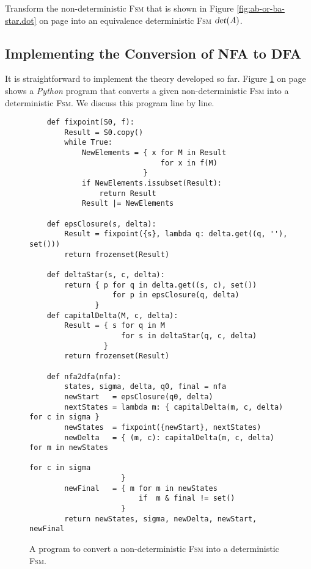 \exerciseEng
Transform the non-deterministic \textsc{Fsm} that is shown in Figure \ref{fig:ab-or-ba-star.dot} on page
\pageref{fig:ab-or-ba-star.dot} 
into an equivalence deterministic \textsc{Fsm} $\textsl{det}(A)$. \eox


\subsection{Implementing the Conversion of NFA to DFA}
It is straightforward to implement the theory developed so far. 
Figure \ref{fig:NFA-2-DFA.ipynb} on page \pageref{fig:NFA-2-DFA.ipynb} shows a \textsl{Python} program 
that converts a given non-deterministic \textsc{Fsm} into a deterministic \textsc{Fsm}.
We discuss this program line by line.

\begin{figure}[!ht]
\centering
\begin{verbatim}
    def fixpoint(S0, f):
        Result = S0.copy()
        while True:
            NewElements = { x for M in Result 
                              for x in f(M) 
                          }
            if NewElements.issubset(Result):
                return Result
            Result |= NewElements

    def epsClosure(s, delta):
        Result = fixpoint({s}, lambda q: delta.get((q, ''), set()))
        return frozenset(Result)

    def deltaStar(s, c, delta):
        return { p for q in delta.get((s, c), set())
                   for p in epsClosure(q, delta)
               }
    def capitalDelta(M, c, delta):
        Result = { s for q in M 
                     for s in deltaStar(q, c, delta) 
                 }
        return frozenset(Result)
    
    def nfa2dfa(nfa):
        states, sigma, delta, q0, final = nfa
        newStart   = epsClosure(q0, delta)
        nextStates = lambda m: { capitalDelta(m, c, delta) for c in sigma }
        newStates  = fixpoint({newStart}, nextStates)
        newDelta   = { (m, c): capitalDelta(m, c, delta) for m in newStates
                                                         for c in sigma
                     }
        newFinal   = { m for m in newStates 
                         if  m & final != set() 
                     }
        return newStates, sigma, newDelta, newStart, newFinal
\end{verbatim}
\vspace*{-0.3cm}
\caption{A program to convert a non-deterministic \textsc{Fsm} into a deterministic \textsc{Fsm}.}
\label{fig:NFA-2-DFA.ipynb}
\end{figure}

